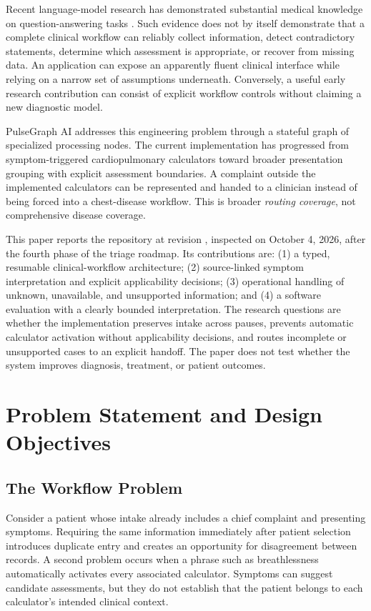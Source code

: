 \documentclass[conference]{IEEEtran}
\newcommand{\system}{PulseGraph AI}
\newcommand{\code}[1]{\texttt{\detokenize{#1}}}
\begin{document}
Recent language-model research has demonstrated substantial medical knowledge on question-answering tasks \cite{singhal}. Such evidence does not by itself demonstrate that a complete clinical workflow can reliably collect information, detect contradictory statements, determine which assessment is appropriate, or recover from missing data. An application can expose an apparently fluent clinical interface while relying on a narrow set of assumptions underneath. Conversely, a useful early research contribution can consist of explicit workflow controls without claiming a new diagnostic model.

\system{} addresses this engineering problem through a stateful graph of specialized processing nodes. The current implementation has progressed from symptom-triggered cardiopulmonary calculators toward broader presentation grouping with explicit assessment boundaries. A complaint outside the implemented calculators can be represented and handed to a clinician instead of being forced into a chest-disease workflow. This is broader \emph{routing coverage}, not comprehensive disease coverage.

This paper reports the repository at revision \code{266499b}, inspected on October 4, 2026, after the fourth phase of the triage roadmap. Its contributions are: (1) a typed, resumable clinical-workflow architecture; (2) source-linked symptom interpretation and explicit applicability decisions; (3) operational handling of unknown, unavailable, and unsupported information; and (4) a software evaluation with a clearly bounded interpretation. The research questions are whether the implementation preserves intake across pauses, prevents automatic calculator activation without applicability decisions, and routes incomplete or unsupported cases to an explicit handoff. The paper does not test whether the system improves diagnosis, treatment, or patient outcomes.

\section{Problem Statement and Design Objectives}
\subsection{The Workflow Problem}
Consider a patient whose intake already includes a chief complaint and presenting symptoms. Requiring the same information immediately after patient selection introduces duplicate entry and creates an opportunity for disagreement between records. A second problem occurs when a phrase such as breathlessness automatically activates every associated calculator. Symptoms can suggest candidate assessments, but they do not establish that the patient belongs to each calculator's intended clinical context.
\end{document}
